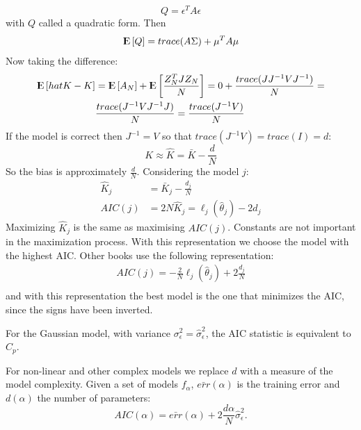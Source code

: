 \documentclass[12pt, letterpaper]{article}
\theoremstyle{definition}
\newcommand{\E}{{\rm I\kern-.3em E}}
\begin{document}
\begin{equation}
Q = \epsilon^T A \epsilon
\end{equation} 
with $Q$ called a quadratic form. Then
\begin{equation}
\E\left[ Q\right] = trace(A\Sigma)+\mu^TA\mu
\end{equation}
Now taking the difference:
\begin{equation}
\begin{aligned}
\E\left[hat{K}-K\right] &= \E\left[A_N\right]+\E\left[ \frac{Z_N^TJZ_N}{N}\right] = 0 + \frac{trace(J J^{-1}VJ^{-1})}{N}=\\
& \frac{trace(J^{-1}VJ^{-1}J)}{N}= \frac{trace(J^{-1}V)}{N} 
\end{aligned}
\end{equation}
If the model is correct then $J^{-1}=V$ so that $trace(J^{-1}V)= trace(I)=d$:
\begin{equation}
K \approx\hat{K} =  \bar{K} -\frac{d}{N}
\end{equation}
So the bias is approximately $\frac{d}{N}$.
Considering the model $j$:
\begin{equation}
\begin{aligned}
\hat{K}_j &= \bar{K}_j -\frac{d_j}{N}\\
AIC(j) &= 2N \hat{K}_j = \ell_j(\hat{\theta}_j) -2d_j
\end{aligned}
\end{equation}
Maximizing $\hat{K}_j$ is the same as maximising $AIC(j)$. Constants are not important in the maximization process. With this representation we choose the model with the highest AIC.
Other books use the following representation:
\begin{equation}
\begin{aligned}
AIC(j) =-\frac{2}{N}\ell_j(\hat{\theta}_j) +2\frac{d_j}{N}\\
\end{aligned}
\end{equation}
and with this representation the best model is the one that minimizes the AIC, since the signs have been inverted.

For the Gaussian model, with variance $\sigma^2_\epsilon = \hat{\sigma}^2_\epsilon$, the AIC statistic is equivalent to $C_p$.

For non-linear and other complex models we replace $d$ with a measure of the model complexity. Given a set of models $f_\alpha$, $\bar{err}(\alpha)$ is the training error and $d(\alpha)$ the number of parameters:
\begin{equation}
AIC(\alpha) = \bar{err}(\alpha) + 2\frac{d\alpha}{N}\hat{\sigma}^2_\epsilon.
\end{equation}
\end{document}
